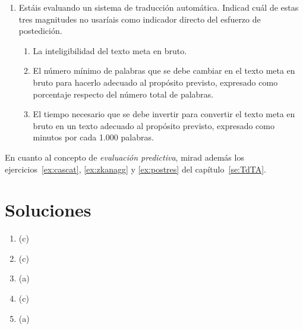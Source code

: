 \begin{enumerate}
\item Estáis evaluando un sistema de traducción automática. Indicad cuál de estas tres magnitudes no usaríais como indicador directo del esfuerzo de postedición. \begin{enumerate} \item La inteligibilidad del texto meta en bruto. \item El número mínimo de palabras que se debe cambiar en el texto meta en bruto para hacerlo adecuado al propósito previsto, expresado como porcentaje respecto del número total de palabras. \item El tiempo necesario que se debe invertir para convertir el texto meta en bruto en un texto adecuado al propósito previsto, expresado como minutos por cada 1.000 palabras. \end{enumerate} 

\end{enumerate} 

En cuanto al concepto de \emph{evaluación predictiva}, mirad además los ejercicios~\ref{ex:cascat}, \ref{ex:zkanagg} y \ref{ex:postres} del  capítulo~\ref{se:TdTA}. 

\section{Soluciones} 

\begin{enumerate} \item (c) \item (c) \item (a) \item (c) \item (a) \end{enumerate} 

